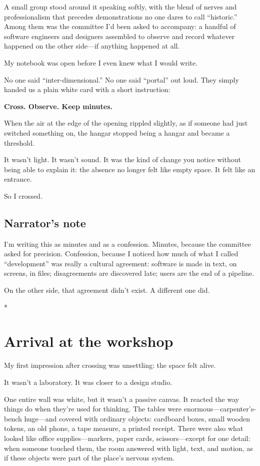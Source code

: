 \documentclass[11pt,a4paper]{article}
\newcommand{\separador}{\begin{center}* \quad * \quad *\end{center}}
\begin{document}
A small group stood around it speaking softly, with the blend of nerves and
professionalism that precedes demonstrations no one dares to call
``historic.'' Among them was the committee I'd been asked to accompany: a
handful of software engineers and designers assembled to observe and record
whatever happened on the other side---if anything happened at all.

My notebook was open before I even knew what I would write.

No one said ``inter-dimensional.'' No one said ``portal'' out loud. They
simply handed us a plain white card with a short instruction:

\begin{center}
\textbf{Cross. Observe. Keep minutes.}
\end{center}

When the air at the edge of the opening rippled slightly, as if someone had
just switched something on, the hangar stopped being a hangar and became a
threshold.

It wasn't light. It wasn't sound. It was the kind of change you notice
without being able to explain it: the absence no longer felt like empty
space. It felt like an entrance.

So I crossed.

\subsection{Narrator's note}

I'm writing this as minutes and as a confession. Minutes, because the
committee asked for precision. Confession, because I noticed how much of what
I called ``development'' was really a cultural agreement: software is made in
text, on screens, in files; disagreements are discovered late; users are the
end of a pipeline.

On the other side, that agreement didn't exist. A different one did.

\separador

\section{Arrival at the workshop}

My first impression after crossing was unsettling: the space felt alive.

It wasn't a laboratory. It was closer to a design studio.

One entire wall was white, but it wasn't a passive canvas. It reacted the way
things do when they're used for thinking. The tables were
enormous---carpenter's-bench huge---and covered with ordinary objects:
cardboard boxes, small wooden tokens, an old phone, a tape measure, a printed
receipt. There were also what looked like office supplies---markers, paper
cards, scissors---except for one detail: when someone touched them, the room
answered with light, text, and motion, as if these objects were part of the
place's nervous system.
\end{document}
